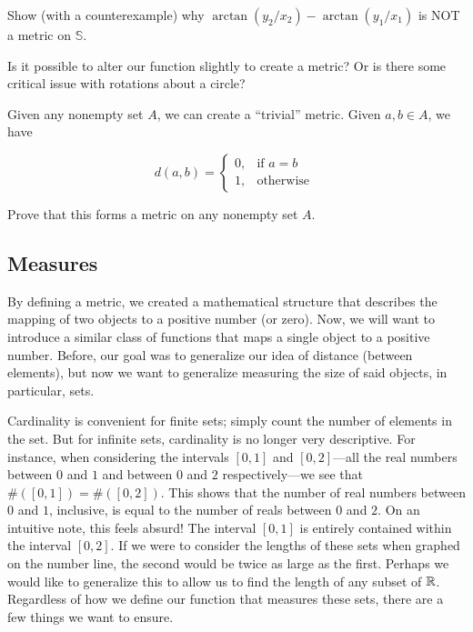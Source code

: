 \begin{exercise}
    Show (with a counterexample) why $\arctan(y_2/x_2)-\arctan(y_1/x_1)$ is NOT a metric on $\mathbb{S}$.
\end{exercise}

\begin{exercise}
    Is it possible to alter our function slightly to create a metric? Or is there some critical issue with rotations about a circle?
\end{exercise}

Given any nonempty set $A$, we can create a ``trivial'' metric. Given $a,b\in A$, we have

\begin{equation}
d(a,b) = 
\left\{
    \begin{array}{lr}
        0, & \text{if } a=b\\
        1, & \text{otherwise }
    \end{array}
\right. 
\end{equation}

\begin{exercise}
    Prove that this forms a metric on any nonempty set $A$.
\end{exercise}

\clearpage

\subsection{Measures}

By defining a metric, we created a mathematical structure that describes the mapping of two objects to a positive number (or zero). Now, we will want to introduce a similar class of functions that maps a single object to a positive number. Before, our goal was to generalize our idea of distance (between elements), but now we want to generalize measuring the size of said objects, in particular, sets. \par

Cardinality is convenient for finite sets; simply count the number of elements in the set. But for infinite sets, cardinality is no longer very descriptive. For instance, when considering the intervals $[0,1]$ and $[0,2]$---all the real numbers between $0$ and $1$ and between $0$ and $2$ respectively---we see that $\#([0,1])=\#([0,2])$. This shows that the number of real numbers between $0$ and $1$, inclusive, is equal to the number of reals between $0$ and $2$. On an intuitive note, this feels absurd! The interval $[0,1]$ is entirely contained within the interval $[0,2]$. If we were to consider the lengths of these sets when graphed on the number line, the second would be twice as large as the first. Perhaps we would like to generalize this to allow us to find the length of any subset of $\mathbb{R}$. Regardless of how we define our function that measures these sets, there are a few things we want to ensure. 

